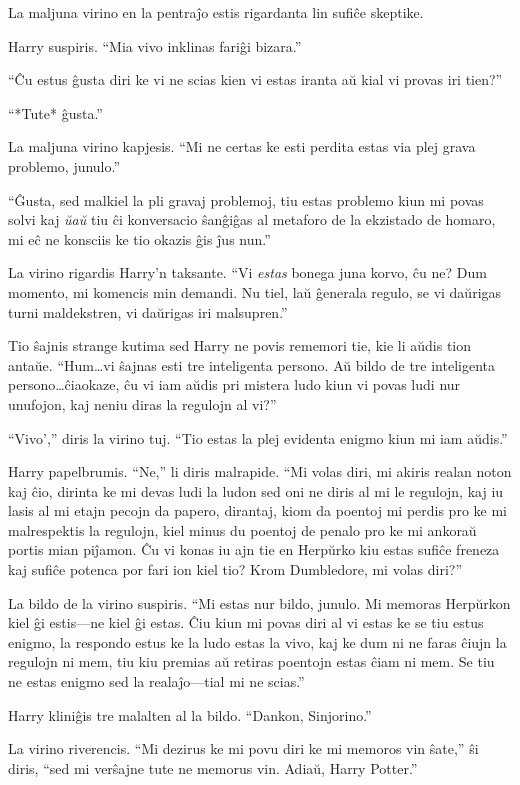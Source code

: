 La maljuna virino en la pentraĵo estis rigardanta lin sufiĉe skeptike.

Harry suspiris. ``Mia vivo inklinas fariĝi bizara.''

``Ĉu estus ĝusta diri ke vi ne scias kien vi estas iranta aŭ kial vi
provas iri tien?''

``*Tute* ĝusta.''

La maljuna virino kapjesis. ``Mi ne certas ke esti perdita estas via
plej grava problemo, junulo.''

``Ĝusta, sed malkiel la pli gravaj problemoj, tiu estas problemo kiun mi povas
solvi kaj \emph{ŭaŭ} tiu ĉi konversacio ŝanĝiĝas al metaforo de la ekzistado de
homaro, mi eĉ ne konsciis ke tio okazis ĝis ĵus nun.''

La virino rigardis Harry'n taksante. ``Vi \emph{estas} bonega juna
korvo, ĉu ne? Dum momento, mi komencis min demandi. Nu tiel, laŭ
ĝenerala regulo, se vi daŭrigas turni maldekstren, vi daŭrigas
iri malsupren.''

Tio ŝajnis strange kutima sed Harry ne povis rememori tie, kie li aŭdis tion
antaŭe. ``Hum\ldots vi ŝajnas esti tre inteligenta persono. Aŭ bildo de tre
inteligenta persono\ldots ĉiaokaze, ĉu vi iam aŭdis pri mistera ludo kiun vi povas
ludi nur unufojon, kaj neniu diras la regulojn al vi?''

``Vivo','' diris la virino tuj. ``Tio estas la plej evidenta enigmo
kiun mi iam aŭdis.''

Harry papelbrumis. ``Ne,'' li diris malrapide. ``Mi volas diri, mi akiris realan
noton kaj ĉio, dirinta ke mi devas ludi la ludon sed oni ne diris al mi le
regulojn, kaj iu lasis al mi etajn pecojn da papero, dirantaj, kiom da poentoj
mi perdis pro ke mi malrespektis la regulojn, kiel minus du poentoj de penalo
pro ke mi ankoraŭ portis mian piĵamon. Ĉu vi konas iu ajn tie en Herpŭrko kiu
estas sufiĉe freneza kaj sufiĉe potenca por fari ion kiel tio? Krom Dumbledore,
mi volas diri?''

La bildo de la virino suspiris. ``Mi estas nur bildo, junulo. Mi memoras
Herpŭrkon kiel ĝi estis—ne kiel ĝi estas. Ĉiu kiun mi povas diri al vi estas ke
se tiu estus enigmo, la respondo estus ke la ludo estas la vivo, kaj ke dum ni
ne faras ĉiujn la regulojn ni mem, tiu kiu premias aŭ retiras poentojn estas
ĉiam ni mem. Se tiu ne estas enigmo sed la realaĵo—tial mi ne scias.''

Harry kliniĝis tre malalten al la bildo. ``Dankon, Sinjorino.''

La virino riverencis. ``Mi dezirus ke mi povu diri ke mi memoros vin ŝate,'' ŝi
diris, ``sed mi verŝajne tute ne memorus vin. Adiaŭ, Harry Potter.''

